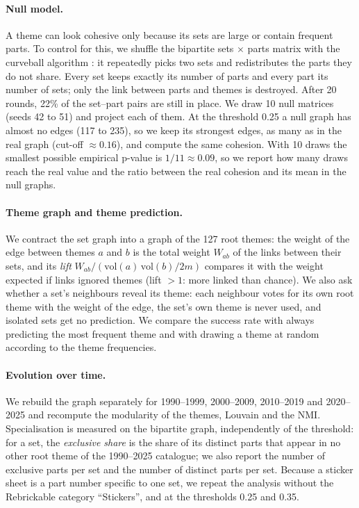 \documentclass[10pt,a4paper]{article}
\begin{document}
\paragraph{Null model.} A theme can look cohesive only because its sets are
large or contain frequent parts. To control for this, we shuffle the bipartite
sets $\times$ parts matrix with the curveball algorithm \cite{strona2014}: it
repeatedly picks two sets and redistributes the parts they do not share. Every
set keeps exactly its number of parts and every part its number of sets; only
the link between parts and themes is destroyed. After 20 rounds, 22\% of the
set--part pairs are still in place. We draw 10 null matrices (seeds 42 to 51)
and project each of them. At the threshold 0.25 a null graph has almost no
edges (117 to 235), so we keep its strongest edges, as many as in the real
graph (cut-off $\approx 0.16$), and compute the same cohesion. With 10 draws
the smallest possible empirical p-value is $1/11 \approx 0.09$, so we report
how many draws reach the real value and the ratio between the real cohesion
and its mean in the null graphs.

\paragraph{Theme graph and theme prediction.} We contract the set graph into a
graph of the 127 root themes: the weight of the edge between themes $a$ and
$b$ is the total weight $W_{ab}$ of the links between their sets, and its
\emph{lift} $W_{ab} / (\mathrm{vol}(a)\,\mathrm{vol}(b)/2m)$ compares it with
the weight expected if links ignored themes (lift $>1$: more linked than
chance). We also ask whether a set's neighbours reveal its theme: each
neighbour votes for its own root theme with the weight of the edge, the set's
own theme is never used, and isolated sets get no prediction. We compare the
success rate with always predicting the most frequent theme and with drawing a
theme at random according to the theme frequencies.

\paragraph{Evolution over time.} We rebuild the graph separately for 1990--1999,
2000--2009, 2010--2019 and 2020--2025 and recompute the modularity of the
themes, Louvain and the NMI. Specialisation is measured on the bipartite graph,
independently of the threshold: for a set, the \emph{exclusive share} is the
share of its distinct parts that appear in no other root theme of the
1990--2025 catalogue; we also report the number of exclusive parts per set and
the number of distinct parts per set. Because a sticker sheet is a part number
specific to one set, we repeat the analysis without the Rebrickable category
``Stickers'', and at the thresholds 0.25 and 0.35.
\end{document}
